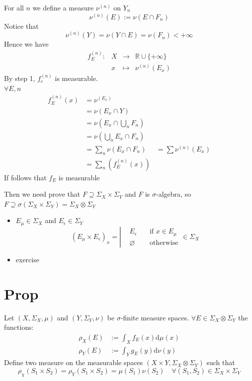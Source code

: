 \documentclass{book}
\begin{document}
\begin{itemize}
    For all $n$ we define a measure $\nu^{(n)}$ on $Y_n$
    $$\nu^{(n)}(E):=\nu(E\cap F_n)$$
    Notice that $$\nu^{(n)}(Y)=\nu(Y\cap E)=\nu(F_n)<+\infty$$
    Hence we have 
    $$\begin{aligned}
        f_E^{(n)}: &X&\rightarrow&\mathbb{R}\cup\{+\infty\}\\
        &x&\mapsto&\nu^{(n)}(E_x)
    \end{aligned}$$
    By step 1, $f_e^{(n)}$ is measurable.\\
    $\forall E,n$
    $$\begin{aligned}
        f_E^{(n)}(x)&=\nu^(E_x)\\
        &=\nu(E_x\cap Y)\\
        &=\nu\left(E_x\cap\bigcup\limits_nF_n\right)\\
        &=\nu\left(\bigcup\limits_nE_x\cap F_n\right)\\
        &=\sum\limits_n\nu(E_x\cap F_n)
        &=\sum\limits\nu^{(n)}(E_x)\\
        &=\sum\limits_n(f_E^{(n)}(x))
    \end{aligned}$$
    If follows that $f_E$ is measurable
    
    Then we need prove that $F\supseteq\Sigma_X\times\Sigma_Y$ and $F$ is $\sigma$-algebra, so $F\supseteq\sigma(\Sigma_X\times\Sigma_Y)=\Sigma_X\otimes\Sigma_Y$
    \begin{itemize}
        \item $E_\mu\in \Sigma_X$ and $E_\epsilon\in \Sigma_Y$$$(E_\mu\times E_\epsilon)_x=\left|\begin{aligned}
            &E_\epsilon\quad &\text{if }x\in E_\mu\\
            &\varnothing\quad &\text{otherwise}
        \end{aligned}\right.\in \Sigma_X$$
        \item exercise
    \end{itemize}
    
\end{itemize}
\section{Prop}
\label{Prop 53.10}
Let $(X,\Sigma_X,\mu)$ and $(Y,\Sigma_Y,\nu)$ be $\sigma$-finite measure spaces. $\forall E\in \Sigma_X\otimes\Sigma_Y$ the functions:
$$\begin{aligned}
    \rho_X(E) &:=\int_Xf_E(x)\text{d}\mu(x)\\
    \rho_Y(E) &:=\int_Yg_E(y)\text{d}\nu(y)
\end{aligned}$$
Define two measure on the measurable spaces $(X\times Y,\Sigma_X\otimes\Sigma_Y)$ such that
$$\rho_\chi(S_1\times S_2)=\rho_Y(S_1\times S_2)=\mu(S_1)\nu(S_2)\quad \forall(S_1,S_2)\in\Sigma_X\times \Sigma_Y$$
\end{document}
